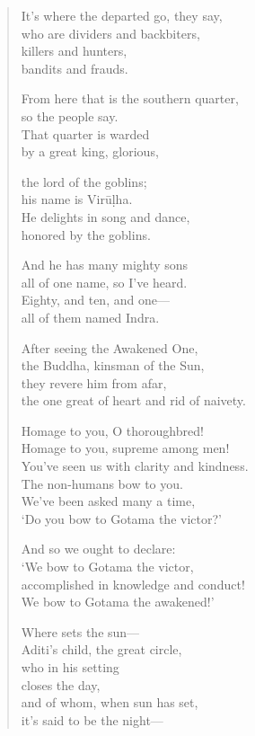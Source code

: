 \documentclass[12pt,openany]{book}%
\begin{document}
\begin{verse}
It’s where the departed go, they say, \\
who are dividers and backbiters, \\
killers and hunters, \\
bandits and frauds. 

From here that is the southern quarter, \\
so the people say. \\
That quarter is warded \\
by a great king, glorious, 

the lord of the goblins; \\
his name is \textsanskrit{Virūḷha}. \\
He delights in song and dance, \\
honored by the goblins. 

And he has many mighty sons \\
all of one name, so I’ve heard. \\
Eighty, and ten, and one—\\
all of them named Indra. 

After seeing the Awakened One, \\
the Buddha, kinsman of the Sun, \\
they revere him from afar, \\
the one great of heart and rid of naivety. 

Homage to you, O thoroughbred! \\
Homage to you, supreme among men! \\
You’ve seen us with clarity and kindness. \\
The non-humans bow to you. \\
We’ve been asked many a time, \\
‘Do you bow to Gotama the victor?’ 

And so we ought to declare: \\
‘We bow to Gotama the victor, \\
accomplished in knowledge and conduct! \\
We bow to Gotama the awakened!’ 

Where sets the sun—\\
Aditi’s child, the great circle, \\
who in his setting \\
closes the day, \\
and of whom, when sun has set, \\
it’s said to be the night—


\end{verse}
\end{document}
